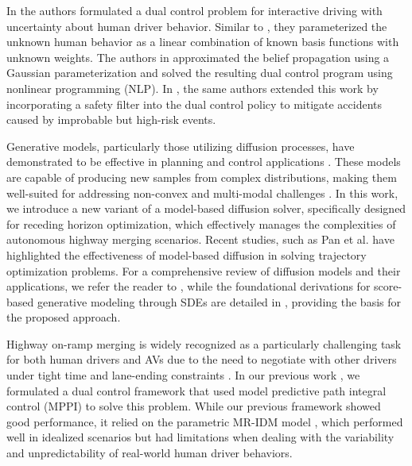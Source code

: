 In \cite{hu2022active} the authors formulated a dual control problem for interactive driving with uncertainty about human driver behavior.
Similar to \cite{nair2022stochastic}, they parameterized the unknown human behavior as a linear combination of known basis functions with unknown weights.
The authors in \cite{hu2022active} approximated the belief propagation using a Gaussian parameterization and solved the resulting dual control program using nonlinear programming (NLP). In \cite{hu2024active}, the same authors extended this work by incorporating a safety filter into the dual control policy to mitigate accidents caused by improbable but high-risk events.

Generative models, particularly those utilizing diffusion processes, have demonstrated to be effective in planning and control applications \cite{janner2022planning, chi2023diffusion, sun2024conformal, psenka2023learning}. 
These models are capable of producing new samples from complex distributions, making them well-suited for addressing non-convex and multi-modal challenges \cite{ho2020denoising,song2019generative}. 
In this work, we introduce a new variant of a model-based diffusion solver, specifically designed for receding horizon optimization, which effectively manages the complexities of autonomous highway merging scenarios. 
Recent studies, such as Pan et al. \cite{pan2024model} have highlighted the effectiveness of model-based diffusion in solving trajectory optimization problems. 
For a comprehensive review of diffusion models and their applications, we refer the reader to \cite{yang2023diffusion}, while the foundational derivations for score-based generative modeling through SDEs are detailed in \cite{song2020score}, providing the basis for the proposed approach.

Highway on-ramp merging is widely recognized as a particularly challenging task for both human drivers and AVs due to the need to negotiate with other drivers under tight time and lane-ending constraints  \cite{rios2016survey,fernandez2021highway}. 
In our previous work \cite{knaup2024active}, we formulated a dual control framework that used model predictive path integral control (MPPI) to solve this problem. 
While our previous framework showed good performance, it relied on the parametric MR-IDM model \cite{holley2023mr}, which performed well in idealized scenarios but had limitations when dealing with the variability and unpredictability of real-world human driver behaviors.